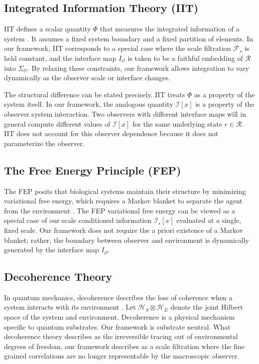 \documentclass[12pt]{article}
\theoremstyle{definition}
\begin{document}
\subsection{Integrated Information Theory (IIT)}
IIT defines a scalar quantity $\Phi$ that measures the integrated information of a system \cite{tononi2016integrated}. It assumes a fixed system boundary and a fixed partition of elements. In our framework, IIT corresponds to a special case where the scale filtration $\mathcal{F}_s$ is held constant, and the interface map $I_{\mathcal{O}}$ is taken to be a faithful embedding of $\mathcal{R}$ into $\Sigma_{\mathcal{O}}$. By relaxing these constraints, our framework allows integration to vary dynamically as the observer scale or interface changes.

The structural difference can be stated precisely. IIT treats $\Phi$ as a property of the system itself. In our framework, the analogous quantity $\mathcal{I}[x]$ is a property of the observer system interaction. Two observers with different interface maps will in general compute different values of $\mathcal{I}[x]$ for the same underlying state $r \in \mathcal{R}$. IIT does not account for this observer dependence because it does not parameterize the observer.

\subsection{The Free Energy Principle (FEP)}
The FEP posits that biological systems maintain their structure by minimizing variational free energy, which requires a Markov blanket to separate the agent from the environment \cite{friston2010free}. The FEP variational free energy can be viewed as a special case of our scale conditioned information $\mathcal{I}_s[x]$ evaluated at a single, fixed scale. Our framework does not require the a priori existence of a Markov blanket; rather, the boundary between observer and environment is dynamically generated by the interface map $I_{\mathcal{O}}$.

\subsection{Decoherence Theory}
In quantum mechanics, decoherence describes the loss of coherence when a system interacts with its environment \cite{zurek2003decoherence}. Let $\mathcal{H}_S \otimes \mathcal{H}_E$ denote the joint Hilbert space of the system and environment. Decoherence is a physical mechanism specific to quantum substrates. Our framework is substrate neutral. What decoherence theory describes as the irreversible tracing out of environmental degrees of freedom, our framework describes as a scale filtration where the fine grained correlations are no longer representable by the macroscopic observer.
\end{document}
